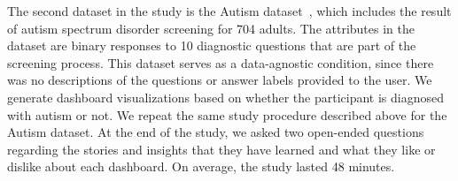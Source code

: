 \par The second dataset in the study is the Autism dataset~\cite{autism}, which includes the result of autism spectrum disorder screening for 704 adults. The attributes in the dataset are binary responses to 10 diagnostic questions that are part of the screening process. This dataset serves as a data-agnostic condition, since there was no descriptions of the questions or answer labels provided to the user. We generate dashboard visualizations based on whether the participant is diagnosed with autism or not. We repeat the same study procedure described above for the Autism dataset. At the end of the study, we asked two open-ended questions regarding the stories and insights that they have learned and what they like or dislike about each dashboard. On average, the study lasted 48 minutes.
